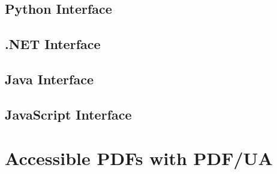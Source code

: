 \documentclass{book}
\begin{document}
\begin{pycpdflib}
\clearpage
\section*{Python Interface}
\begin{small}\tt

\end{small}
\end{pycpdflib}

\begin{dotnetcpdflib}
\clearpage
\section*{.NET Interface}
\begin{small}\tt

\end{small}
\end{dotnetcpdflib}

\begin{jcpdflib}
\clearpage
\section*{Java Interface}
\begin{small}\tt

\end{small}
\end{jcpdflib}

\begin{jscpdflib}
\clearpage
\section*{JavaScript Interface}
\begin{small}\tt

\end{small}
\end{jscpdflib}

\clearpage\pagestyle{empty}
\chapter{Accessible PDFs with PDF/UA}\label{chap:19}\pagestyle{fancy}
\end{document}

